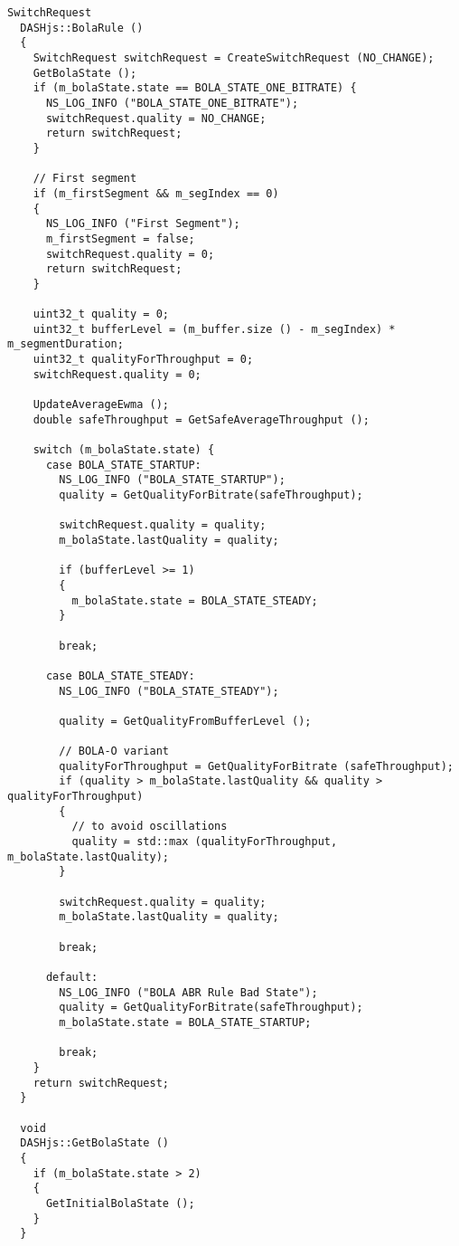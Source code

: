 \begin{lstlisting}[language=myC++, caption={DASHjs.cc}, captionpos=b]
  SwitchRequest
  DASHjs::BolaRule ()
  {
    SwitchRequest switchRequest = CreateSwitchRequest (NO_CHANGE);
    GetBolaState ();
    if (m_bolaState.state == BOLA_STATE_ONE_BITRATE) {
      NS_LOG_INFO ("BOLA_STATE_ONE_BITRATE");
      switchRequest.quality = NO_CHANGE;
      return switchRequest;
    }
  
    // First segment
    if (m_firstSegment && m_segIndex == 0)
    {
      NS_LOG_INFO ("First Segment");
      m_firstSegment = false;
      switchRequest.quality = 0;
      return switchRequest;
    }
  
    uint32_t quality = 0;
    uint32_t bufferLevel = (m_buffer.size () - m_segIndex) * m_segmentDuration;
    uint32_t qualityForThroughput = 0;
    switchRequest.quality = 0;

    UpdateAverageEwma ();
    double safeThroughput = GetSafeAverageThroughput ();
  
    switch (m_bolaState.state) {
      case BOLA_STATE_STARTUP:
        NS_LOG_INFO ("BOLA_STATE_STARTUP");
        quality = GetQualityForBitrate(safeThroughput);
  
        switchRequest.quality = quality;
        m_bolaState.lastQuality = quality;

        if (bufferLevel >= 1)
        {
          m_bolaState.state = BOLA_STATE_STEADY;
        }

        break;
  
      case BOLA_STATE_STEADY:
        NS_LOG_INFO ("BOLA_STATE_STEADY");
  
        quality = GetQualityFromBufferLevel ();
  
        // BOLA-O variant
        qualityForThroughput = GetQualityForBitrate (safeThroughput);
        if (quality > m_bolaState.lastQuality && quality > qualityForThroughput)
        {
          // to avoid oscillations
          quality = std::max (qualityForThroughput, m_bolaState.lastQuality);
        }

        switchRequest.quality = quality;
        m_bolaState.lastQuality = quality;

        break;
  
      default:
        NS_LOG_INFO ("BOLA ABR Rule Bad State");
        quality = GetQualityForBitrate(safeThroughput);
        m_bolaState.state = BOLA_STATE_STARTUP;
  
        break;
    }
    return switchRequest;
  }
  
  void
  DASHjs::GetBolaState ()
  {
    if (m_bolaState.state > 2)
    {
      GetInitialBolaState ();
    }
  }
  

\end{lstlisting}
